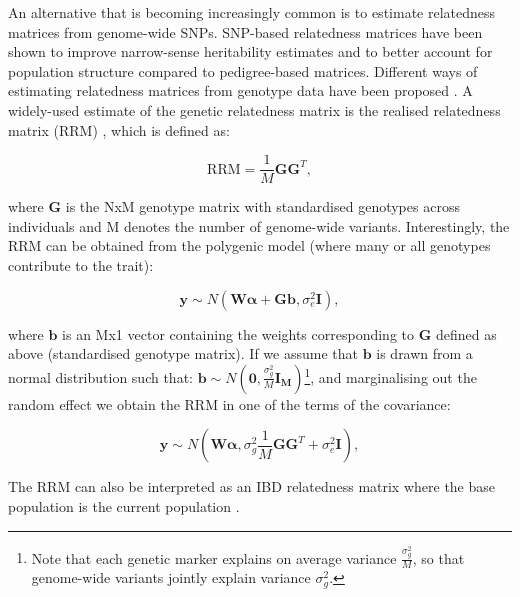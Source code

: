 An alternative that is becoming increasingly common is to estimate relatedness matrices from genome-wide SNPs. 
SNP-based relatedness matrices have been shown to improve narrow-sense heritability estimates \cite{visscher2006assumption, visscher2007genome, hayes2009increased} and to better account for population structure \cite{kang2008efficient, lee2010using} compared to pedigree-based matrices. 
Different ways of estimating relatedness matrices from genotype data have been proposed \cite{oliehoek2006estimating, purcell2007plink, vanraden2008efficient}. 
A widely-used estimate of the genetic relatedness matrix is the realised relatedness matrix (RRM) \cite{hayes2009increased}, which is defined as:

 \begin{equation}
    \mathrm{RRM} = \frac{1}{M}\mathbf{G}\mathbf{G}^T,
\end{equation}

where $\mathbf{G}$ is the NxM genotype matrix with standardised genotypes across individuals and M denotes the number of genome-wide variants. 
Interestingly, the RRM can be obtained from the polygenic model (where many or all genotypes contribute to the trait):

\begin{equation}\label{eq:polygenic_model}
    \mathbf{y} \sim N (\mathbf{W}\boldsymbol{\alpha} +  \mathbf{G}\mathbf{b}, \sigma_e^2\mathbf{I}),
\end{equation}

where $\mathbf{b}$ is an Mx1 vector containing the weights corresponding to $\mathbf{G}$ defined as above (standardised genotype matrix).
If we assume that $\mathbf{b}$ is drawn from a normal distribution such that: $\mathbf{b} \sim N(\mathbf{0}, \frac{\sigma_g^2}{M} \mathbf{I_M})$\footnote{Note that each genetic marker explains on average variance $\frac{\sigma_g^2}{M}$, so that genome-wide variants jointly explain variance $\sigma_g^2$.}, and marginalising out the random effect we obtain the RRM in one of the terms of the covariance:

\begin{equation}\label{eq:polygenic_model_MVN}
    \mathbf{y} \sim N (\mathbf{W}\boldsymbol{\alpha}, \sigma_g^2\frac{1}{M}\mathbf{G}\mathbf{G}^T + \sigma_e^2\mathbf{I} ),
\end{equation}

The RRM can also be interpreted as an IBD relatedness matrix where the base population
is the current population \cite{powell2010reconciling}.

